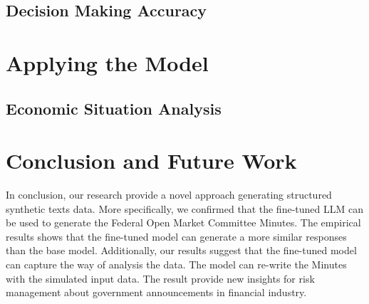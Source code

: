 \subsection{Decision Making Accuracy}











\section{Applying the Model}\label{ch2:sec:apply}

\subsection{Economic Situation Analysis}

\subsection{}













\section{Conclusion and Future Work}\label{ch2:sec:conclusion}

In conclusion, our research provide a novel approach generating structured synthetic texts data. More specifically, we confirmed that the fine-tuned LLM can be used to generate the Federal Open Market Committee Minutes. The empirical results shows that the fine-tuned model can generate a more similar responses than the base model. Additionally, our results suggest that the fine-tuned model can capture the way of analysis the data. The model can re-write the Minutes with the simulated input data. The result provide new insights for risk management about government announcements in financial industry.

